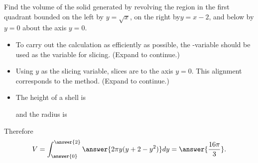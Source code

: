 \documentclass{ximera}
\begin{document}
\begin{example}
Find the volume of the solid generated by revolving the region in the first quadrant bounded on the left by $y = \sqrt{x}$,  on the right by$y = x-2$, and below by $y = 0$ about the axis $y = 0$.
\begin{itemize}
\item To carry out the calculation as efficiently as possible, the -variable should be used as the variable for slicing.
(Expand to continue.)
\end{itemize}
\begin{itemize}
\item Using $y$ as the slicing variable, slices are  to the axis $y=0$. This alignment corresponds to the  method.
(Expand to continue.)
\end{itemize}
\begin{expandable}
\begin{itemize}
\item The height of a shell is 
\begin{multipleChoice}
\end{multipleChoice}
and the radius is
\begin{multipleChoice}
\end{multipleChoice}
\end{itemize}
Therefore
\[ V = \int_{\answer{0}}^{\answer{2}} \answer{2 \pi y(y+2-y^2)} dy = \answer{\frac{16 \pi}{3}}. \]
\end{expandable}
\end{example}
\end{document}
